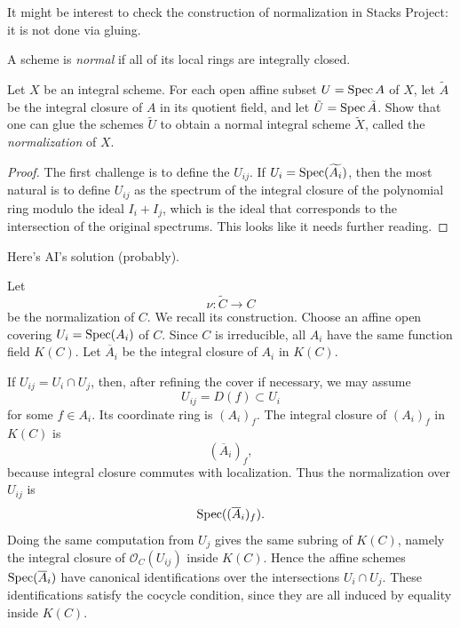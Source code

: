 \noindent
It might be interest to check
the construction of
normalization in Stacks Project:
it is not done via gluing.

\begin{definition}
\label{definition-normal-scheme}
\begin{reference}
\cite[Exercise II.3.8]{hart}
\end{reference}
A scheme is {\it normal} 
if all of its local rings are integrally
closed.
\end{definition}

\begin{exercise}
\label{exercise-normalization-schemes}
\begin{reference}
\cite[Exercise II.3.8]{hart}
\end{reference}
Let $X$ be an integral scheme.
For each open affine subset
$U = \mathop{\mathrm{Spec}} A$ of $X$,
let $\tilde{A}$ be the integral closure
of $A$ in its quotient field,
and let $\tilde{U} = \mathop{\mathrm{Spec}} \tilde{A}$.
Show that one can glue the schemes $\tilde{U}$
to obtain a normal integral scheme
$\tilde{X}$, called
the {\it normalization} of $X$.
\end{exercise}

\begin{proof}
The first challenge is to define
the $U_{ij}$. If $U_i = \mathop{\mathrm{Spec}}(\widetilde{A_i})$,
then the most natural is to define
$U_{ij}$ as the spectrum of the 
integral closure of the polynomial ring
modulo the
ideal $I_i + I_j$, which is the ideal
that corresponds
to the intersection of the original
spectrums. This looks like it needs
further reading.
\end{proof}

\medskip\noindent
Here's AI's solution (probably).

Let
$$
\nu : \widetilde C \longrightarrow C
$$
be the normalization of $C$. We recall its
construction. Choose an affine open covering
$U_i=\mathop{\mathrm{Spec}}(A_i)$ of $C$. Since $C$ is
irreducible, all $A_i$ have the same
function field $K(C)$. Let $\overline A_i$
be the integral closure of $A_i$ in $K(C)$.

If $U_{ij}=U_i\cap U_j$, then, after
refining the cover if necessary, we may
assume
$$
U_{ij}=D(f)\subset U_i
$$
for some $f\in A_i$. Its coordinate ring is
$(A_i)_f$. The integral closure of
$(A_i)_f$ in $K(C)$ is
$$
(\overline A_i)_f,
$$
because integral closure commutes with
localization. Thus the normalization over
$U_{ij}$ is
$$
\mathop{\mathrm{Spec}}((\overline A_i)_f).
$$
Doing the same computation from $U_j$ gives
the same subring of $K(C)$, namely the
integral closure of $\mathcal O_C(U_{ij})$
inside $K(C)$. Hence the affine schemes
$\mathop{\mathrm{Spec}}(\overline A_i)$ have canonical
identifications over the intersections
$U_i\cap U_j$. These identifications satisfy
the cocycle condition, since they are all
induced by equality inside $K(C)$.

